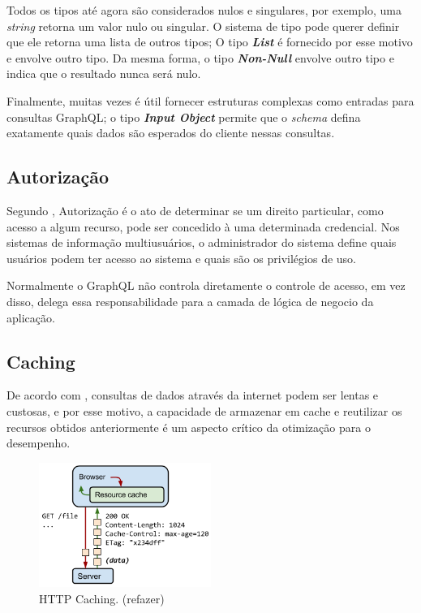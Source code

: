 Todos os tipos até agora são considerados nulos e singulares, por exemplo,  uma \textit{string} retorna um valor nulo ou singular. O sistema de tipo pode querer definir que ele retorna uma lista de outros tipos; O tipo \textit{\textbf{List}} é fornecido por esse motivo e envolve outro tipo. Da mesma forma, o tipo \textit{\textbf{Non-Null}} envolve outro tipo e indica que o resultado nunca será nulo.

Finalmente, muitas vezes é útil fornecer estruturas complexas como entradas para consultas GraphQL; o tipo \textit{\textbf{Input Object}} permite que o \textit{schema} defina exatamente quais dados são esperados do cliente nessas consultas.


\subsection{Autorização}

Segundo , Autorização é o ato de determinar se um direito particular, como acesso a algum recurso, pode ser concedido à uma determinada credencial. Nos sistemas de informação multiusuários, o administrador do sistema define quais usuários podem ter acesso ao sistema e quais são os privilégios de uso.

Normalmente o GraphQL não controla diretamente o controle de acesso, em vez disso, delega essa responsabilidade para a camada de lógica de negocio da aplicação. 


\subsection{Caching}

De acordo com , consultas de dados através da internet podem ser lentas e custosas, e por esse motivo, a capacidade de armazenar em cache e reutilizar os recursos obtidos anteriormente é um aspecto crítico da otimização para o desempenho.

\begin{figure}[htbp]
\centering
\includegraphics[width=0.5\textwidth]{figuras/cache-http.png}
\caption{HTTP Caching. (refazer)}
\label{fig:cache-graph}
\author{https://developers.google.com/web/fundamentals/performance/optimizing-content-efficiency/http-caching}
\end{figure}

